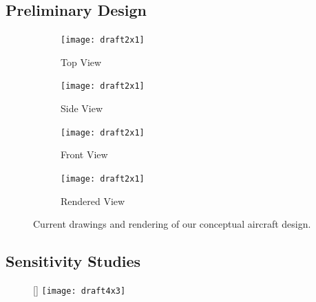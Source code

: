 \documentclass[proposal]{byu-aero}
\begin{document}
\lipsum[1]



\subsection{Preliminary Design}
\label{ssec:PreliminaryDesign}

\begin{figure}[h!]
	\centering
	\begin{subfigure}[b]{0.475\textwidth}
		\texttt{[image: draft2x1]}
		\caption{Top View}
		\label{fig:topview}
	\end{subfigure}
	\begin{subfigure}[b]{0.475\textwidth}
		\texttt{[image: draft2x1]}
		\caption{Side View}
		\label{fig:sideview}
	\end{subfigure}

	\begin{subfigure}[b]{0.475\textwidth}
		\texttt{[image: draft2x1]}
		\caption{Front View}
		\label{fig:frontview}
	\end{subfigure}
	\begin{subfigure}[b]{0.475\textwidth}
		\texttt{[image: draft2x1]}
		\caption{Rendered View}
		\label{fig:renderedview}
	\end{subfigure}
	\caption{Current drawings and rendering of our conceptual aircraft design.}
	\label{fig:prelimdrawings}
\end{figure}

\lipsum[1-5]


\subsection{Sensitivity Studies}
\label{ssec:SensitivityStudies}

\begin{figure}
	\centering
		\raisebox{0pt}[\dimexpr{}\baselineskip\relax]{
	\texttt{[image: draft4x3]}}
	\caption{}
	\label{fig:sensitivity}
\end{figure}
\lipsum[1-2]
\end{document}
